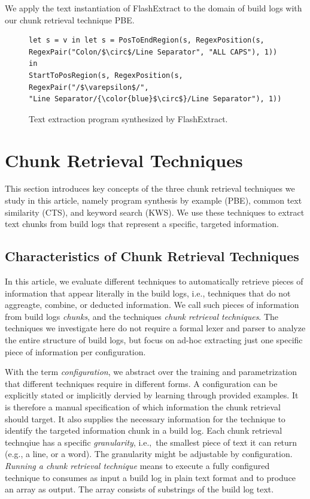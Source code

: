 We apply the text instantiation of FlashExtract to the domain of build
logs with our chunk retrieval technique PBE\@.

\begin{figure}[!t]
  \centering
  \begin{lstlisting}[breaklines=true]
let s = v in let s = PosToEndRegion(s, RegexPosition(s,
RegexPair("Colon/$\circ$/Line Separator", "ALL CAPS"), 1)) in
StartToPosRegion(s, RegexPosition(s, RegexPair("/$\varepsilon$/",
"Line Separator/{\color{blue}$\circ$}/Line Separator"), 1))
  \end{lstlisting}
  \caption{Text extraction program synthesized by FlashExtract.}
  \label{lst:prose-program}
\end{figure}

\section{Chunk Retrieval Techniques}
\label{sec:techniques}
This section introduces key concepts of the three chunk retrieval
techniques we study in this article, namely program synthesis by
example (PBE), common text similarity (CTS), and keyword search (KWS).
We use these techniques to extract text chunks from build logs that
represent a specific, targeted information.

\subsection{Characteristics of Chunk Retrieval Techniques}
\label{sec:blirt}
In this article, we evaluate different techniques to automatically
retrieve pieces of information that appear literally in the build
logs, i.e., techniques that do not aggreagte, combine, or deducted
information.
We call such pieces of information from build logs
\emph{chunks}, and the techniques \emph{chunk retrieval techniques}.
The techniques we investigate here do not require a formal lexer and
parser to analyze the entire structure of build logs, but focus on
ad-hoc extracting just one specific piece of information per
configuration.

With the term \textit{configuration}, we abstract over the training
and parametrization that different techniques require in different
forms.
A configuration can be explicitly stated or implicitly dervied
by learning through provided examples.
It is therefore a manual
specification of which information the chunk retrieval should target.
It also supplies the necessary information for the technique to
identify the targeted information chunk in a build log.
Each chunk
retrieval technqiue has a specific \textit{granularity}, i.e.,\ the
smallest piece of text it can return (e.g., a line, or a word).
The
granularity might be adjustable by configuration.
\emph{Running a
chunk retrieval technique} means to execute a fully configured
technique to consumes as input a build log in plain text format and to
produce an array as output.
The array consists of substrings of the
build log text.


